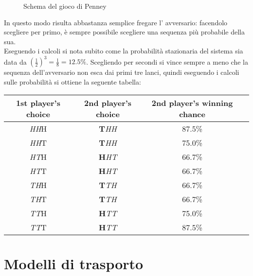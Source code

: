 \documentclass[12pt, a4paper]{book}
\theoremstyle{theorem}
\begin{document}
\begin{figure}
\begin{tikzpicture}[x=0.75pt,y=0.75pt,yscale=-1,xscale=1]
					\end{tikzpicture}
					\caption{Schema del gioco di Penney}
					\label{Penney's scheme}
				\end{figure}
				In questo modo risulta abbastanza semplice fregare l' avversario: facendolo scegliere per primo, è sempre possibile scegliere una sequenza più probabile della sua.\\
				Eseguendo i calcoli si nota subito come la probabilità stazionaria del sistema sia data da $\left(\frac{1}{2}\right)^3=\frac{1}{8}=12.5\%$.
				Scegliendo per secondi si vince sempre a meno che la sequenza dell'avversario non esca dai primi tre lanci, quindi eseguendo i calcoli sulle probabilità si ottiene la seguente tabella:
				\begin{center}
					\begin{tabular}{ |c|c|c|c| } 
						\hline
						1st player's choice& 2nd player's choice & 2nd player's winning chance\\
						\hline
						\emph{HH}H & \textbf{T}\emph{HH} & 87.5\% \\
						\emph{HH}T & \textbf{T}\emph{HH} & 75.0\% \\
						\emph{HT}H & \textbf{H}\emph{HT} & 66.7\% \\
						\emph{HT}T & \textbf{H}\emph{HT} & 66.7\% \\
						\emph{TH}H & \textbf{T}\emph{TH} & 66.7\% \\
						\emph{TH}T & \textbf{T}\emph{TH} & 66.7\% \\
						\emph{TT}H & \textbf{H}\emph{TT} & 75.0\% \\
						\emph{TT}T & \textbf{H}\emph{TT} & 87.5\% \\
						\hline
					\end{tabular}
				\end{center}

	\chapter{Modelli di trasporto} %
\end{document}

